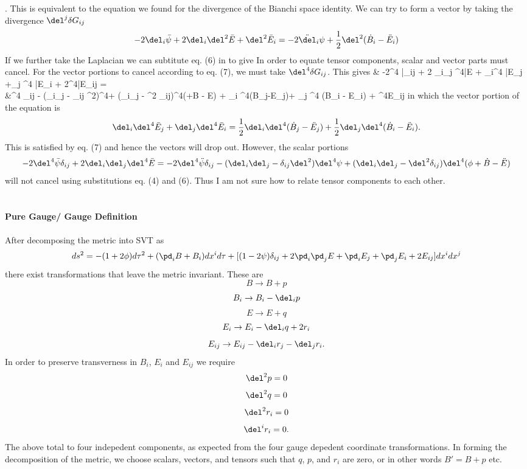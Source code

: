 \documentclass[10pt,letterpaper]{article}
\begin{document}
\be
	.
\ee
This is equivalent to the equation we found for the divergence of the Bianchi space identity. We can try to form a vector by taking the divergence $\del^j\delta G_{ij}$
\[
	-2\del_i \bar \psi + 2\del_i \del^2 \bar E + \del^2 \bar E_i = -2\ddot \del_i \psi+\frac12 \del^2(\dot B_i - \ddot E_i)
\]
If we further take the Laplacian we can subtitute eq. (6) in to give
\be
\ee
In order to equate tensor components, scalar and vector parts must cancel. For the vector portions to cancel according to eq. (7), we must take $\del^4 \delta G_{ij}$. This gives
\ba
	& -2\del^4 \bar \psi \delta_{ij} + 2 \del_i\del_j \del^4\bar E + \del_i\del^4 \bar E_j +\del_j \del^4 \bar E_i + 2\del^4\bar E_{ij} =\\
	&\del^4 \ddot \psi \delta_{ij} - (\del_i\del_j - \delta_{ij} \del^2)\del^4\psi + (\del_i\del_j - \del^2 \delta_{ij})\del^4(\phi+\dot B - \ddot E) +  \del_i \del^4(\dot B_j-\ddot E_j)+ \del_j \del^4 (\dot B_i - \ddot E_i) + \del^4\Box E_{ij}
\ea
in which the vector portion of the equation is 
\[
	\del_i\del^4 \bar E_j + \del_j \del^4 \bar E_i =  \frac12 \del_i \del^4(\dot B_j-\ddot E_j)+\frac12 \del_j \del^4 (\dot B_i - \ddot E_i).
\]
This is satisfied by eq. (7) and hence the vectors will drop out. 
However, the scalar portions 
\[
	-2\del^4 \bar \psi \delta_{ij} + 2 \del_i\del_j \del^4\bar E = -2\del^4 \ddot \psi \delta_{ij} - (\del_i\del_j - \delta_{ij} \del^2)\del^4\psi + (\del_i\del_j - \del^2 \delta_{ij})\del^4(\phi+\dot B - \ddot E)
\]
will not cancel using substitutions eq. (4) and (6). Thus I am not sure how to relate tensor components to each other. 
\\ \\ \\
\noindent \textbf{Pure Gauge/ Gauge Definition}
\\ \\
After decomposing the metric into SVT as
\[
	ds^2 = -(1+2\phi)d\tau^2 + (\pd_i B+B_i)dx^id\tau + [(1-2\psi)\delta_{ij}+2\pd_i\pd_j E + \pd_i E_j+\pd_j E_i + 2E_{ij}]dx^i dx^j
\]
there exist transformations that leave the metric invariant. These are
\[
	B \to B + p
\]
\[
	B_i \to B_i - \del_i p
\]
\[
	E\to E+q
\]
\[
	E_i\to E_i - \del_i q + 2r_i
\]
\[
	E_{ij} \to E_{ij} - \del_i r_j - \del_j r_i.
\]
In order to preserve transverness in $B_i$, $E_i$ and $E_{ij}$ we require
\[
	\del^2 p = 0
\]
\[
	\del^2 q= 0
\]
\[
	\del^2 r_i = 0
\]
\[
	\del^i r_i = 0.
\]
The above total to four indepedent components, as expected from the four gauge depedent coordinate transformations. In forming the decomposition of the metric, we choose scalars, vectors, and tensors such that $q$, $p$, and $r_i$ are zero, or in other words $B' = B+p$ etc. 
\end{document}
